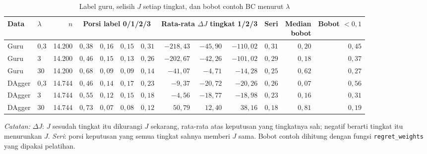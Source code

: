 \begin{table}[htbp]
\caption{Label guru, selisih $J$ setiap tingkat, dan bobot contoh BC menurut $\lambda$}
\label{tab:latih-guru}
\centering\footnotesize
\setlength{\tabcolsep}{4pt}
\begin{adjustbox}{max width=\textwidth}
\begin{tabular}{llrrrrrrrrrrr}
\toprule
Data & $\lambda$ & $n$ & \multicolumn{4}{c}{Porsi label 0/1/2/3} & \multicolumn{3}{c}{Rata-rata $\Delta J$ tingkat 1/2/3} & Seri & \shortstack[r]{Median\\bobot} & \shortstack[r]{Bobot\\$<0{,}1$} \\
\midrule
Guru & 0{,}3 & 14.200 & $0{,}38$ & $0{,}16$ & $0{,}15$ & $0{,}31$ & $-218{,}43$ & $-45{,}90$ & $-110{,}02$ & $0{,}31$ & $0{,}20$ & $0{,}45$ \\
Guru & 3 & 14.200 & $0{,}46$ & $0{,}15$ & $0{,}13$ & $0{,}26$ & $-202{,}67$ & $-42{,}26$ & $-101{,}02$ & $0{,}29$ & $0{,}18$ & $0{,}37$ \\
Guru & 30 & 14.200 & $0{,}68$ & $0{,}09$ & $0{,}09$ & $0{,}14$ & $-41{,}07$ & $-4{,}71$ & $-14{,}28$ & $0{,}25$ & $0{,}62$ & $0{,}27$ \\
\addlinespace
DAgger & 0{,}3 & 14.744 & $0{,}46$ & $0{,}14$ & $0{,}17$ & $0{,}23$ & $-9{,}37$ & $-20{,}72$ & $-20{,}26$ & $0{,}26$ & $0{,}07$ & $0{,}56$ \\
DAgger & 3 & 14.744 & $0{,}55$ & $0{,}12$ & $0{,}15$ & $0{,}18$ & $-4{,}56$ & $-18{,}77$ & $-18{,}98$ & $0{,}23$ & $0{,}16$ & $0{,}31$ \\
DAgger & 30 & 14.744 & $0{,}73$ & $0{,}07$ & $0{,}08$ & $0{,}12$ & $50{,}79$ & $12{,}40$ & $38{,}16$ & $0{,}18$ & $0{,}81$ & $0{,}19$ \\
\bottomrule
\end{tabular}
\end{adjustbox}
\par\smallskip\footnotesize\textit{Catatan:} $\Delta J$: $J$ sesudah tingkat itu dikurangi $J$ sekarang, rata-rata atas keputusan yang tingkatnya sah; negatif berarti tingkat itu menurunkan $J$. \emph{Seri}: porsi keputusan yang semua tingkat sahnya memberi $J$ sama. Bobot contoh dihitung dengan fungsi \texttt{regret\_weights} yang dipakai pelatihan.
\end{table}
